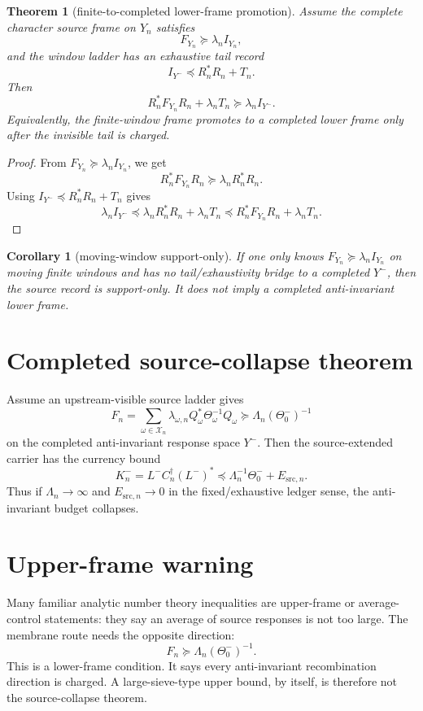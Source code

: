 \documentclass[11pt]{article}
\newtheorem{theorem}{Theorem}
\newtheorem{corollary}{Corollary}
\begin{document}
\begin{theorem}[finite-to-completed lower-frame promotion]
Assume the complete character source frame on $Y_n$ satisfies
\[
  F_{Y_n}\succeq \lambda_n I_{Y_n},
\]
and the window ladder has an exhaustive tail record
\[
  I_{Y^-}\preceq R_n^*R_n+T_n.
\]
Then
\[
  R_n^*F_{Y_n}R_n+\lambda_n T_n\succeq \lambda_n I_{Y^-}.
\]
Equivalently, the finite-window frame promotes to a completed lower frame only after the invisible tail is charged.
\end{theorem}

\begin{proof}
From $F_{Y_n}\succeq\lambda_n I_{Y_n}$, we get
\[
  R_n^*F_{Y_n}R_n\succeq \lambda_n R_n^*R_n.
\]
Using $I_{Y^-}\preceq R_n^*R_n+T_n$ gives
\[
  \lambda_n I_{Y^-}\preceq \lambda_n R_n^*R_n+\lambda_n T_n
  \preceq R_n^*F_{Y_n}R_n+\lambda_n T_n.
\]
\end{proof}

\begin{corollary}[moving-window support-only]
If one only knows $F_{Y_n}\succeq\lambda_n I_{Y_n}$ on moving finite windows and has no tail/exhaustivity bridge to a completed $Y^-$, then the source record is support-only.  It does not imply a completed anti-invariant lower frame.
\end{corollary}

\section{Completed source-collapse theorem}
Assume an upstream-visible source ladder gives
\[
  F_n=\sum_{\omega\in\mathcal X_n}\lambda_{\omega,n}Q_\omega^*\Theta_\omega^{-1}Q_\omega
  \succeq \Lambda_n(\Theta_0^-)^{-1}
\]
on the completed anti-invariant response space $Y^-$.  Then the source-extended carrier has the currency bound
\[
  K_n^-=L^-C_n^\dagger(L^-)^*\preceq \Lambda_n^{-1}\Theta_0^-+E_{\mathrm{src},n}.
\]
Thus if $\Lambda_n\to\infty$ and $E_{\mathrm{src},n}\to0$ in the fixed/exhaustive ledger sense, the anti-invariant budget collapses.

\section{Upper-frame warning}
Many familiar analytic number theory inequalities are upper-frame or average-control statements: they say an average of source responses is not too large.  The membrane route needs the opposite direction:
\[
  F_n\succeq \Lambda_n(\Theta_0^-)^{-1}.
\]
This is a lower-frame condition.  It says every anti-invariant recombination direction is charged.  A large-sieve-type upper bound, by itself, is therefore not the source-collapse theorem.
\end{document}
